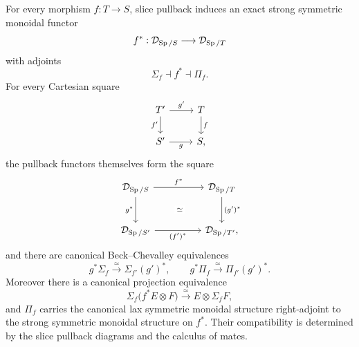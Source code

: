 \begin{theorem}
\label{thm:stable-dependent-adjoints}
For every morphism \(f:T\to S\), slice pullback induces an exact strong symmetric
monoidal functor
\[
  f^*:\mathcal D_{\operatorname{Sp}/S}\longrightarrow\mathcal D_{\operatorname{Sp}/T}
\]
with adjoints
\[
  \Sigma_f\dashv f^*\dashv\Pi_f.
\]
For every Cartesian square
\[
\begin{tikzcd}
T' \ar[r,"g'"] \ar[d,"f'"'] & T \ar[d,"f"]\\
S' \ar[r,"g"'] & S,
\end{tikzcd}
\]
the pullback functors themselves form the square
\[
\begin{tikzcd}[column sep=huge,row sep=large]
  \mathcal D_{\Sp/S} \arrow[r,"f^*"] \arrow[d,"g^*"']
  & \mathcal D_{\Sp/T} \arrow[d,"(g')^*"]
  \\
  \mathcal D_{\Sp/S'} \arrow[r,"(f')^*"']
  & \mathcal D_{\Sp/T'}
    \arrow[ul,phantom,"\scriptstyle\simeq" description],
\end{tikzcd}
\]
and there are canonical Beck--Chevalley equivalences
\[
  g^*\Sigma_f
  \xrightarrow{\simeq}
  \Sigma_{f'}(g')^*,
  \qquad
  g^*\Pi_f
  \xrightarrow{\simeq}
  \Pi_{f'}(g')^*.
\]
Moreover there is a canonical projection equivalence
\[
  \Sigma_f\bigl(f^*E\otimes F\bigr)
  \xrightarrow{\simeq}
  E\otimes\Sigma_fF,
\]
and \(\Pi_f\) carries the canonical lax symmetric monoidal structure right-adjoint
to the strong symmetric monoidal structure on \(f^*\). Their compatibility is determined by the slice pullback diagrams and the
calculus of mates.
\end{theorem}

